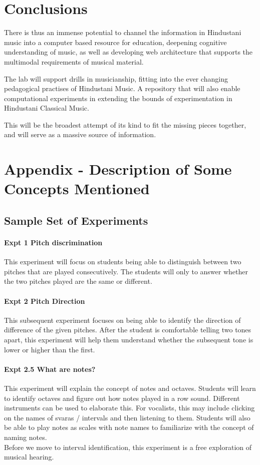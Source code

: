 \documentclass{tufte-handout}
\begin{document}
\section{Conclusions}
There is thus an immense potential to channel the information in Hindustani music into a computer based resource for education, deepening cognitive understanding of music, as well as developing web architecture that supports the multimodal requirements of musical material.

The lab will support drills in musicianship, fitting into the ever changing pedagogical practises of Hindustani Music. A repository that will also enable computational experiments in extending the bounds of experimentation in Hindustani Classical Music. 

This will be the broadest attempt of its kind to fit the missing pieces together, and will serve as a massive source of information.




\section{Appendix - Description of Some Concepts Mentioned}

\subsection{Sample Set of Experiments}
\paragraph{Expt 1 Pitch discrimination}
This experiment will focus on students being able to distinguish
between two pitches that are played consecutively. The students will
only to answer whether the two pitches played are the same or
different.
\paragraph{Expt 2 Pitch Direction}

This subsequent experiment focuses on being able to identify the
direction of difference of the given pitches. After the student is
comfortable telling two tones apart, this experiment will help them
understand whether the subsequent tone is lower or higher than the
first.
\paragraph{Expt 2.5 What are notes?}
This experiment will explain the concept of notes and
octaves. Students will learn to identify octaves and figure out how
notes played in a row sound. Different instruments can be used to
elaborate this. For vocalists, this may include clicking on the names
of svaras / intervals and then listening to them. Students will also
be able to play notes as scales with note names to familiarize with
the concept of naming notes.\\
Before we move to interval identification, this experiment is a free
exploration of musical hearing.
\end{document}
